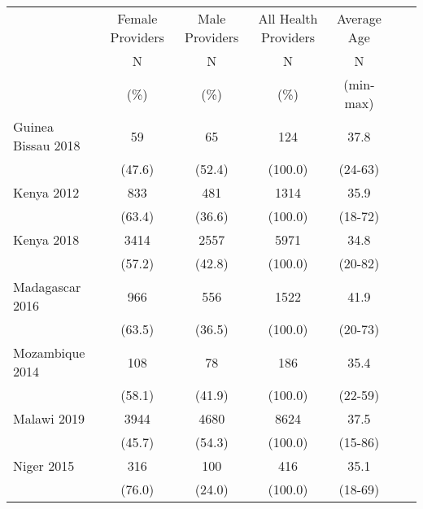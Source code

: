 \def\sym#1{\ifmmode^{#1}\else\(^{#1}\)\fi}
\begin{tabular}{l*{6}{c}}
\hline\hline
         &\multicolumn{1}{c}{Female Providers}&\multicolumn{1}{c}{Male Providers}&\multicolumn{1}{c}{All Health Providers}&\multicolumn{1}{c}{Average Age}&\\
               &       N&                     N&       N&                                       N\\
               &     (\%)&                 (\%)&    (\%)&                                     (min-max)\\
\hline
Guinea Bissau 2018&            {59}&                {65}&           {124}&             {37.8}\\
&                                              {(47.6)}&      {(52.4)}&             {(100.0)}&           {(24-63)}\\
Kenya 2012&                            {833}&                {481}&           {1314}&             {35.9}\\
&                                              {(63.4)}&      {(36.6)}&             {(100.0)}&           {(18-72)}\\
Kenya 2018&                    {3414}&                {2557}&           {5971}&             {34.8}\\
&                                              {(57.2)}&      {(42.8)}&             {(100.0)}&           {(20-82)}\\
Madagascar 2016&               {966}&                {556}&           {1522}&             {41.9}\\
&                                              {(63.5)}&      {(36.5)}&             {(100.0)}&           {(20-73)}\\
Mozambique 2014&               {108}&                {78}&           {186}&             {35.4}\\
&                                              {(58.1)}&      {(41.9)}&             {(100.0)}&           {(22-59)}\\
Malawi 2019&                   {3944}&                {4680}&           {8624}&             {37.5}\\
&                                              {(45.7)}&      {(54.3)}&             {(100.0)}&           {(15-86)}\\
Niger 2015&                    {316}&                {100}&           {416}&             {35.1}\\
&                                              {(76.0)}&      {(24.0)}&             {(100.0)}&           {(18-69)}\\

\end{tabular}
